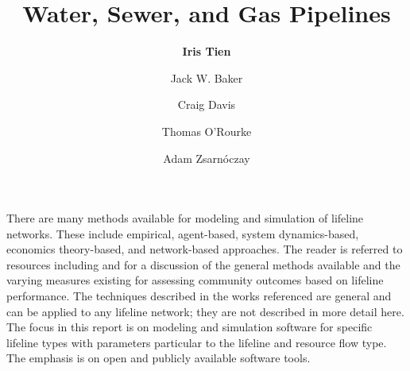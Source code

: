 %
%
%

\title{Water, Sewer, and Gas Pipelines}
\author{
    \textbf{Iris Tien}
    \and {Jack W. Baker}
    \and {Craig Davis}
    \and {Thomas O'Rourke}
    \and {Adam Zsarnóczay}}
\tocauthor{}
%
%
\maketitle
\label{chapter:perf_pipe}

There are many methods available for modeling and simulation of lifeline networks. These include empirical, agent-based, system dynamics-based, economics theory-based, and network-based approaches. The reader is referred to resources including \citet{ouyang2014review} and \citet{johansen2017metrics} for a discussion of the general methods available and the varying measures existing for assessing community outcomes based on lifeline performance. The techniques described in the works referenced are general and can be applied to any lifeline network; they are not described in more detail here. The focus in this report is on modeling and simulation software for specific lifeline types with parameters particular to the lifeline and resource flow type. The emphasis is on open and publicly available software tools.

